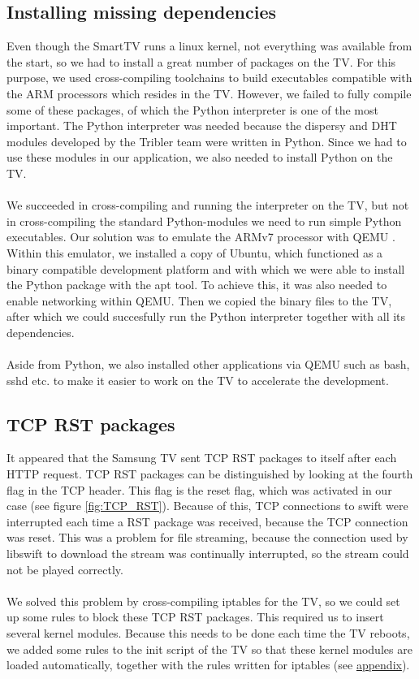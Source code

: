 \subsection{Installing missing dependencies}
Even though the SmartTV runs a linux kernel, not everything was available from the start, so we had to install a great number of packages on the TV.
For this purpose, we used cross-compiling toolchains to build executables compatible with the ARM \cite{arm} processors which resides in the TV. However, we failed
to fully compile some of these packages, of which the Python interpreter is one of the most important. The Python interpreter was needed because the dispersy and DHT modules 
developed by the Tribler team were written in Python. Since we had to use these modules in our application, we also needed to install Python on the TV. 
\\\\
We succeeded in cross-compiling and running the interpreter on the TV, but not in cross-compiling the standard Python-modules we need to run simple Python executables.
Our solution was to emulate the ARMv7 processor with QEMU \cite{qemu}. Within this emulator, we installed a copy of Ubuntu, \cite{ubuntu} which functioned as a binary compatible development platform and with which we were able to install the Python package with the apt tool.
To achieve this, it was also needed to enable networking within QEMU. \cite{qemu-network} Then we copied the binary files to the TV, after which we could succesfully run the Python interpreter together with all its dependencies.
\\\\
Aside from Python, we also installed other applications via QEMU such as bash, sshd etc. to make it easier to work on the TV to accelerate the development.

\subsection{TCP RST packages}
It appeared that the Samsung TV sent TCP RST packages to itself after each HTTP request. TCP RST packages can be distinguished by looking at the fourth flag in the TCP header. This flag is the reset flag, which was activated in our case (see figure \ref{fig:TCP_RST}). Because of this, TCP connections to swift were interrupted each time a RST package was received, because the TCP connection was reset. This was a problem for file streaming, because the connection used by libswift to download the stream was continually interrupted, so the stream could not be played correctly. 
\\\\
We solved this problem by cross-compiling iptables\cite{iptables} for the TV, so we could set up some rules to block these TCP RST packages. This required us to insert several kernel modules. Because this needs to be done each time the TV reboots, we added some rules to the init script of the TV so that these kernel modules are loaded automatically, together with the rules written for iptables (see \hyperref[sec:vusb_init]{appendix}).

